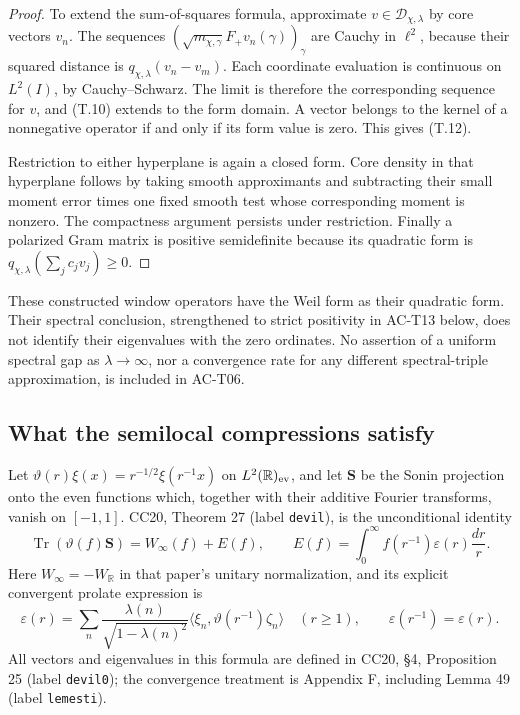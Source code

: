 \begin{proof}
To extend the sum-of-squares formula, approximate
\(v\in\mathcal D_{\chi,\lambda}\) by core vectors \(v_n\).
The sequences
\((\sqrt{m_{\chi,\gamma}}F_+v_n(\gamma))_\gamma\)
are Cauchy in \(\ell^2\), because their squared distance
is \(q_{\chi,\lambda}(v_n-v_m)\). Each coordinate
evaluation is continuous on \(L^2(I)\), by
Cauchy--Schwarz. The limit is therefore the corresponding
sequence for \(v\), and (T.10) extends to the form domain.
A vector belongs to the kernel of a nonnegative operator
if and only if its form value is zero. This gives (T.12).

Restriction to either hyperplane is again a closed form.
Core density in that hyperplane follows by taking smooth
approximants and subtracting their small moment error
times one fixed smooth test whose corresponding moment
is nonzero. The compactness argument persists under
restriction. Finally a polarized Gram matrix is
positive semidefinite because its quadratic form is
\(q_{\chi,\lambda}(\sum_j c_jv_j)\geq0\).
\end{proof}

These constructed window operators have the Weil form
as their quadratic form. Their spectral conclusion, strengthened to strict positivity
in AC-T13 below, does not identify their eigenvalues with
the zero ordinates. No assertion
of a uniform spectral gap as \(\lambda\to\infty\), nor
a convergence rate for any different spectral-triple
approximation, is included in AC-T06.

\subsection{What the semilocal compressions satisfy}

Let \(\vartheta(r)\xi(x)=r^{-1/2}\xi(r^{-1}x)\) on
\(L^2(\mathbb R)_{\rm ev}\), and let \(\mathbf S\) be
the Sonin projection onto the even functions which,
together with their additive Fourier transforms,
vanish on \([-1,1]\). CC20, Theorem 27
(label \texttt{devil}), is the unconditional identity
\[
 \operatorname{Tr}(\vartheta(f)\mathbf S)
      =W_\infty(f)+E(f),\qquad
 E(f)=\int_0^\infty f(r^{-1})\varepsilon(r)\frac{dr}{r}.          \tag{T.14}
\]
Here \(W_\infty=-W_{\mathbb R}\) in that paper's unitary
normalization, and its explicit convergent prolate
expression is
\[
 \varepsilon(r)=
 \sum_n\frac{\lambda(n)}{\sqrt{1-\lambda(n)^2}}
       \langle \xi_n,\vartheta(r^{-1})\zeta_n\rangle
 \quad(r\geq1),\qquad \varepsilon(r^{-1})=\varepsilon(r).
                                                               \tag{T.15}
\]
All vectors and eigenvalues in this formula are defined
in CC20, \S4, Proposition 25 (label \texttt{devil0});
the convergence treatment is Appendix F, including
Lemma 49 (label \texttt{lemesti}).

